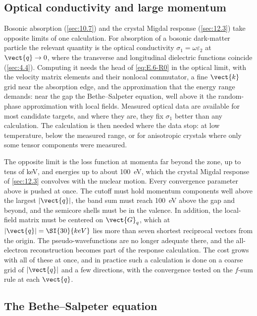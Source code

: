 \subsection{Optical conductivity and large momentum}

Bosonic absorption (\cref{sec:10.7}) and the crystal Migdal response (\cref{sec:12.3}) take opposite limits of one calculation. For absorption of a bosonic dark-matter particle the relevant quantity is the optical conductivity $\sigma_1 = \omega\varepsilon_2$ at $\vect{q}\to0$, where the transverse and longitudinal dielectric functions coincide (\cref{sec:4.4}). Computing it needs the head of \cref{eq:E.6-R0} in the optical limit, with the velocity matrix elements and their nonlocal commutator, a fine $\vect{k}$ grid near the absorption edge, and the approximation that the energy range demands: near the gap the Bethe--Salpeter equation, well above it the random-phase approximation with local fields. Measured optical data are available for most candidate targets, and where they are, they fix $\sigma_1$ better than any calculation. The calculation is then needed where the data stop: at low temperature, below the measured range, or for anisotropic crystals where only some tensor components were measured.

The opposite limit is the loss function at momenta far beyond the zone, up to tens of keV, and energies up to about \SI{100}{eV}, which the crystal Migdal response of \cref{sec:12.3} convolves with the nuclear motion. Every convergence parameter above is pushed at once. The cutoff must hold momentum components well above the largest $|\vect{q}|$, the band sum must reach \SI{100}{eV} above the gap and beyond, and the semicore shells must be in the valence. In addition, the local-field matrix must be centered on $\vect{G}_q$, which at $|\vect{q}| = \SI{30}{keV}$ lies more than seven shortest reciprocal vectors from the origin. The pseudo-wavefunctions are no longer adequate there, and the all-electron reconstruction becomes part of the response calculation. The cost grows with all of these at once, and in practice such a calculation is done on a coarse grid of $|\vect{q}|$ and a few directions, with the convergence tested on the $f$-sum rule at each $\vect{q}$.

\subsection{The Bethe--Salpeter equation}

